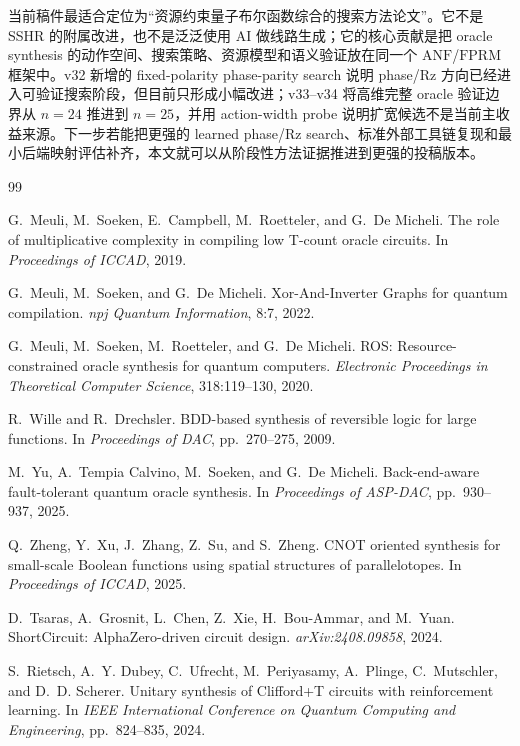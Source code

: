 \documentclass[UTF8,fontset=macnew,11pt]{ctexart}
\newcommand{\anf}{\ensuremath{\mathrm{ANF}}}
\newcommand{\fprm}{\ensuremath{\mathrm{FPRM}}}
\begin{document}
当前稿件最适合定位为“资源约束量子布尔函数综合的搜索方法论文”。它不是 SSHR 的附属改进，也不是泛泛使用 AI 做线路生成；它的核心贡献是把 oracle synthesis 的动作空间、搜索策略、资源模型和语义验证放在同一个 \anf{}/\fprm{} 框架中。v32 新增的 fixed-polarity phase-parity search 说明 phase/Rz 方向已经进入可验证搜索阶段，但目前只形成小幅改进；v33--v34 将高维完整 oracle 验证边界从 $n=24$ 推进到 $n=25$，并用 action-width probe 说明扩宽候选不是当前主收益来源。下一步若能把更强的 learned phase/Rz search、标准外部工具链复现和最小后端映射评估补齐，本文就可以从阶段性方法证据推进到更强的投稿版本。

\begin{thebibliography}{99}

G.~Meuli, M.~Soeken, E.~Campbell, M.~Roetteler, and G.~De Micheli.
\newblock The role of multiplicative complexity in compiling low T-count oracle circuits.
\newblock In \emph{Proceedings of ICCAD}, 2019.

G.~Meuli, M.~Soeken, and G.~De Micheli.
\newblock Xor-And-Inverter Graphs for quantum compilation.
\newblock \emph{npj Quantum Information}, 8:7, 2022.

G.~Meuli, M.~Soeken, M.~Roetteler, and G.~De Micheli.
\newblock ROS: Resource-constrained oracle synthesis for quantum computers.
\newblock \emph{Electronic Proceedings in Theoretical Computer Science}, 318:119--130, 2020.

R.~Wille and R.~Drechsler.
\newblock BDD-based synthesis of reversible logic for large functions.
\newblock In \emph{Proceedings of DAC}, pp.~270--275, 2009.

M.~Yu, A.~Tempia Calvino, M.~Soeken, and G.~De Micheli.
\newblock Back-end-aware fault-tolerant quantum oracle synthesis.
\newblock In \emph{Proceedings of ASP-DAC}, pp.~930--937, 2025.

Q.~Zheng, Y.~Xu, J.~Zhang, Z.~Su, and S.~Zheng.
\newblock CNOT oriented synthesis for small-scale Boolean functions using spatial structures of parallelotopes.
\newblock In \emph{Proceedings of ICCAD}, 2025.

D.~Tsaras, A.~Grosnit, L.~Chen, Z.~Xie, H.~Bou-Ammar, and M.~Yuan.
\newblock ShortCircuit: AlphaZero-driven circuit design.
\newblock \emph{arXiv:2408.09858}, 2024.

S.~Rietsch, A.~Y. Dubey, C.~Ufrecht, M.~Periyasamy, A.~Plinge, C.~Mutschler, and D.~D. Scherer.
\newblock Unitary synthesis of Clifford+T circuits with reinforcement learning.
\newblock In \emph{IEEE International Conference on Quantum Computing and Engineering}, pp.~824--835, 2024.


\end{thebibliography}
\end{document}
